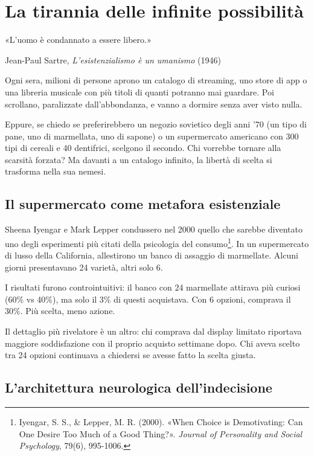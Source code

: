 
\chapter{La tirannia delle infinite possibilità}
\label{cap:p2c21}

\epigraph{«L'uomo è condannato a essere libero.»}{Jean-Paul Sartre, \textit{L'esistenzialismo è un umanismo} (1946)}

Ogni sera, milioni di persone aprono un catalogo di streaming, uno store di app o una libreria musicale con più titoli di quanti potranno mai guardare. Poi scrollano, paralizzate dall'abbondanza, e vanno a dormire senza aver visto nulla.

Eppure, se chiedo se preferirebbero un negozio sovietico degli anni '70 (un tipo di pane, uno di marmellata, uno di sapone) o un supermercato americano con 300 tipi di cereali e 40 dentifrici, scelgono il secondo. Chi vorrebbe tornare alla scarsità forzata? Ma davanti a un catalogo infinito, la libertà di scelta si trasforma nella sua nemesi.

\section{Il supermercato come metafora esistenziale}

Sheena Iyengar e Mark Lepper condussero nel 2000 quello che sarebbe diventato uno degli esperimenti più citati della psicologia del consumo\footnote{Iyengar, S. S., \& Lepper, M. R. (2000). «When Choice is Demotivating: Can One Desire Too Much of a Good Thing?». \textit{Journal of Personality and Social Psychology}, 79(6), 995-1006.}. In un supermercato di lusso della California, allestirono un banco di assaggio di marmellate. Alcuni giorni presentavano 24 varietà, altri solo 6.

I risultati furono controintuitivi: il banco con 24 marmellate attirava più curiosi (60\% vs 40\%), ma solo il 3\% di questi acquistava. Con 6 opzioni, comprava il 30\%. Più scelta, meno azione.

Il dettaglio più rivelatore è un altro: chi comprava dal display limitato riportava maggiore soddisfazione con il proprio acquisto settimane dopo. Chi aveva scelto tra 24 opzioni continuava a chiedersi se avesse fatto la scelta giusta.

\section{L'architettura neurologica dell'indecisione}

